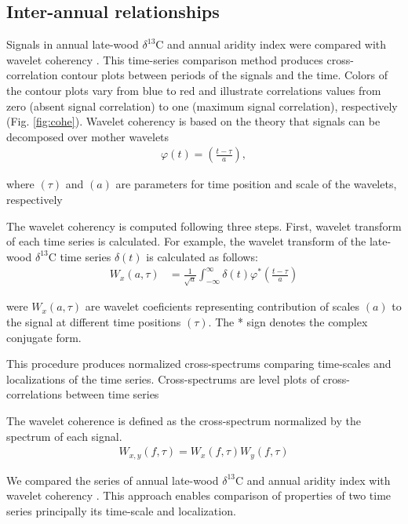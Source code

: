 \documentclass[review,authoryear]{elsarticle}
\begin{document}
\subsection{Inter-annual relationships}
Signals in annual late-wood $\delta^{13}$C and annual aridity index
were compared with wavelet coherency \citep{Cazelles2008}. This
time-series comparison method produces cross-correlation contour plots
between periods of the signals and the time. Colors of the contour
plots vary from blue to red and illustrate correlations values from
zero (absent signal correlation) to one (maximum signal correlation),
respectively (Fig. \ref{fig:cohe}).  Wavelet coherency is based on the
theory that signals can be decomposed over mother wavelets
\begin{align}
\varphi(t)=\left(\frac{t-\tau}{a}\right)\mathrm{,}
\end{align}

where $(\tau)$ and $(a)$ are parameters for time position and 
scale of the wavelets, respectively



The wavelet coherency is computed following three steps. First,
wavelet transform of each time series is calculated. For example, the
wavelet transform of the late-wood $\delta^{13}$C time series $\delta(t)$
is calculated as follows:
\begin{align}\label{eq:wtransform}
W_{x}(a,\tau)
&=\frac{1}{\sqrt{a}}\int_{-\infty}^{\infty}\delta(t)
\varphi^{*}\left(\frac{t-\tau}{a}\right)
\end{align}

were $W_{x}(a,\tau)$ are wavelet coeficients representing contribution
of scales $(a)$ to the signal at different time positions
$(\tau)$. The * sign denotes the complex conjugate form.


This
procedure produces normalized cross-spectrums comparing time-scales
and localizations of the time series. Cross-spectrums are level plots
of cross-correlations between time series
 


The
wavelet coherence is defined as the cross-spectrum normalized by the
spectrum of each signal. 
\begin{align}\label{eq:sqrtAI1}
W_{x,y}(f,\tau)=W_{x}(f,\tau)W_{y}(f,\tau)
\end{align}



We compared the series of annual late-wood $\delta^{13}$C and annual
aridity index with wavelet coherency \citep{}. This approach enables
comparison of properties of two time series principally its time-scale
and localization.
\end{document}
